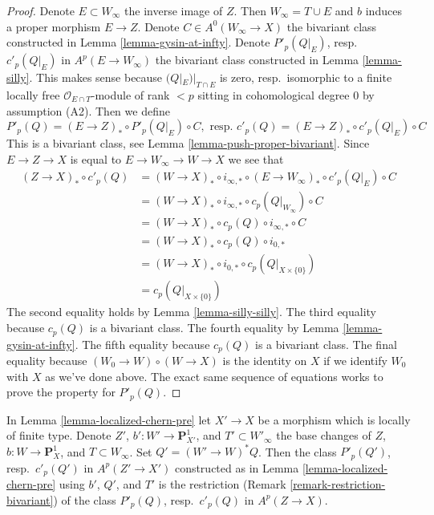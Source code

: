 \begin{proof}
Denote $E \subset W_\infty$ the inverse image of $Z$. Then
$W_\infty = T \cup E$ and $b$ induces a proper morphism $E \to Z$.
Denote $C \in A^0(W_\infty \to X)$ the bivariant class constructed
in Lemma \ref{lemma-gysin-at-infty}. Denote $P'_p(Q|_E)$, resp.\ $c'_p(Q|_E)$
in $A^p(E \to W_\infty)$ the bivariant class constructed
in Lemma \ref{lemma-silly}. This makes sense because
$(Q|_E)|_{T \cap E}$ is zero, resp.\ isomorphic to a finite locally free
$\mathcal{O}_{E \cap T}$-module of rank $< p$ sitting in
cohomological degree $0$ by assumption (A2). Then we define
$$
P'_p(Q) = (E \to Z)_* \circ P'_p(Q|_E) \circ C,\text{ resp. }
c'_p(Q) = (E \to Z)_* \circ c'_p(Q|_E) \circ C
$$
This is a bivariant class, see Lemma \ref{lemma-push-proper-bivariant}.
Since $E \to Z \to X$ is equal to $E \to W_\infty \to W \to X$ we see that
\begin{align*}
(Z \to X)_* \circ c'_p(Q)
& =
(W \to X)_* \circ i_{\infty, *} \circ (E \to W_\infty)_*
\circ c'_p(Q|_E) \circ C \\
& =
(W \to X)_* \circ i_{\infty, *} \circ c_p(Q|_{W_\infty}) \circ C \\
& =
(W \to X)_* \circ c_p(Q) \circ i_{\infty, *} \circ C \\
& =
(W \to X)_*\circ c_p(Q) \circ i_{0, *} \\
& =
(W \to X)_* \circ i_{0, *} \circ c_p(Q|_{X \times \{0\}}) \\
& =
c_p(Q|_{X \times \{0\}})
\end{align*}
The second equality holds by Lemma \ref{lemma-silly-silly}.
The third equality because $c_p(Q)$ is a bivariant class.
The fourth equality by Lemma \ref{lemma-gysin-at-infty}.
The fifth equality because $c_p(Q)$ is a bivariant class.
The final equality because $(W_0 \to W) \circ (W \to X)$
is the identity on $X$ if we identify $W_0$ with $X$ as we've
done above. The exact same sequence of equations works to
prove the property for $P'_p(Q)$.
\end{proof}

\begin{lemma}
\label{lemma-base-change-localized-chern-pre}
In Lemma \ref{lemma-localized-chern-pre} let $X' \to X$ be a morphism
which is locally of finite type. Denote
$Z'$, $b' : W' \to \mathbf{P}^1_{X'}$, and $T' \subset W'_\infty$
the base changes of $Z$, $b : W \to \mathbf{P}^1_X$, and $T \subset W_\infty$.
Set $Q' = (W' \to W)^*Q$. Then the class
$P'_p(Q')$, resp.\ $c'_p(Q')$ in $A^p(Z' \to X')$ constructed as in
Lemma \ref{lemma-localized-chern-pre} using $b'$, $Q'$, and $T'$
is the restriction (Remark \ref{remark-restriction-bivariant})
of the class $P'_p(Q)$, resp.\ $c'_p(Q)$ in $A^p(Z \to X)$.
\end{lemma}

